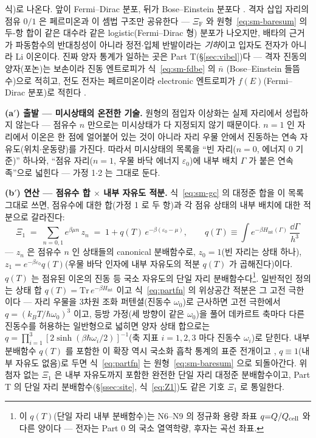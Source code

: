\begin{bgbox}
식)로 나온다. 앞이 Fermi--Dirac 분포, 뒤가 Bose--Einstein 분포다 \cite{mcquarrie1976}. 격자 삽입 자리의
점유 $0/1$ 은 페르미온과 이 셈법 구조만 공유한다 --- $\Xi_\mathrm F$ 와 원형~\eqref{eq:sm-baresum} 의 두-항
합이 같은 대수라 같은 logistic(Fermi--Dirac 형) 분포가 나오지만, 배타의 근거가 파동함수의 반대칭성이 아니라
정전$\cdot$입체 반발이라는 \emph{기하}이고 입자도 전자가 아니라 Li 이온이다. 진짜 양자 통계가 일하는 곳은
Part T(\S\ref{sec:vibel})다 --- 격자 진동의 양자(포논)는 보손이라 진동 엔트로피가 식~\eqref{eq:sm-fdbe} 의 $\bar n$
(Bose--Einstein 들뜸수)으로 적히고, 전도 전자는 페르미온이라 electronic 엔트로피가 $f(E)$(Fermi--Dirac
분포)로 적힌다 \cite{mcquarrie1976,ashcroftmermin1976}.
\end{bgbox}

\textbf{(a$'$) 출발 --- 미시상태의 온전한 기술.} 원형의 점입자 이상화는 실제 자리에서 성립하지 않는다 ---
점유수 $n$ 만으로는 미시상태가 다 지정되지 않기 때문이다. $n=1$ 인 자리에서 이온은 한 점에 얼어붙어
있는 것이 아니라 자리 우물 안에서 진동하는 연속 자유도(위치$\cdot$운동량)를 가진다. 따라서 미시상태의
목록을 ``빈 자리($n=0$, 에너지 $0$ 기준)'' 하나와, ``점유 자리($n=1$, 우물 바닥 에너지
$\varepsilon_0$)에 내부 배치 $\Gamma$ 가 붙은 연속족''으로 넓힌다 --- 가정 1$\cdot$2 는 그대로 둔다.

\textbf{(b$'$) 연산 --- 점유수 합 $\times$ 내부 자유도 적분.} 식~\eqref{eq:sm-gc} 의 대정준 합을 이 목록
그대로 쓰면, 점유수에 대한 합(가정 1 로 두 항)과 각 점유 상태의 내부 배치에 대한 적분으로 갈라진다:
\begin{equation}
\Xi_1\;=\;\sum_{n=0,1}e^{\beta\mu n}\,z_n
\;=\;1+q(T)\,e^{-\beta(\varepsilon_0-\mu)},
\qquad
q(T)\equiv\int e^{-\beta H_\mathrm{int}(\Gamma)}\,\frac{\dd\Gamma}{h^3}
\label{eq:partfn}
\end{equation}
--- $z_n$ 은 점유수 $n$ 인 상태들의 canonical 분배함수로, $z_0=1$(빈 자리는 상태 하나),
$z_1=e^{-\beta\varepsilon_0}q(T)$(우물 바닥 인자에 내부 자유도의 적분 $q(T)$ 가 곱해진다)이다.
$q(T)$ 는 점유된 이온의 진동 등 국소 자유도의 단일 자리 분배함수다\footnote{이 $q(T)$(단일 자리 내부 분배함수)는 N6--N9 의 정규화 용량 좌표 $q{=}Q/Q_{\mathrm{cell}}$ 와 다른 양이다 --- 전자는 Part 0 의 국소 열역학량, 후자는 곡선 좌표.}. 일반적인 정의는 상태
합 $q(T)=\mathrm{Tr}\,e^{-\beta H_\mathrm{int}}$ 이고 식~\eqref{eq:partfn} 의 위상공간 적분은 그 고전
극한이다 --- 자리 우물을 3차원 조화 퍼텐셜(진동수 $\omega_0$)로 근사하면 고전 극한에서
$q=(k_BT/\hbar\omega_0)^3$ 이고, 등방 가정(세 방향이 같은 $\omega_0$)을 풀어 데카르트 축마다 다른
진동수를 허용하는 일반형으로 넓히면 양자 상태 합으로는
$q=\prod_{i=1}^{3}[2\sinh(\beta\hbar\omega_i/2)]^{-1}$(축 지표 $i=1,2,3$ 마다 진동수 $\omega_i$)로 닫힌다.
내부 분배함수 $q(T)$ 를 포함한 이 확장 역시 국소화 흡착 통계의 표준 전개이고
\cite{hill1960,fowler1939,mcquarrie1976}, $q\equiv1$(내부 자유도 없음)로 두면
식~\eqref{eq:partfn} 는 원형~\eqref{eq:sm-baresum} 으로 되돌아간다. 위 첨자 없는 $\Xi_1$ 은 내부
자유도까지 포함한 완전한 단일 자리 대정준 분배함수이고, Part T 의 단일 자리 분배함수(\S\ref{ssec:site},
식~\eqref{eq:Z1})도 같은 기호 $\Xi_1$ 로 통일한다.

